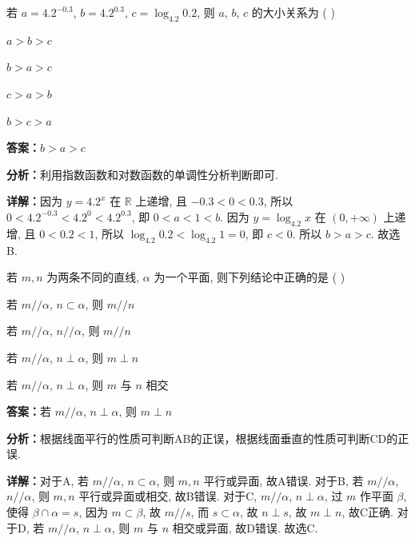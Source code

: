 \begin{question}[points=5]
若 $a = 4.2^{-0.3}$, $b = 4.2^{0.3}$, $c = \log_{4.2}{0.2}$, 则 $a$, $b$, $c$ 的大小关系为 ( )
\begin{choices}
  \item $a > b > c$
  \item $b > a > c$
  \item $c > a > b$
  \item $b > c > a$
\end{choices}
\begin{solution}
\textbf{答案：}$b > a > c$

\textbf{分析：}利用指数函数和对数函数的单调性分析判断即可.

\textbf{详解：}因为 $y=4.2^x$ 在 $\mathbb{R}$ 上递增, 且 $-0.3<0<0.3$, 所以 $0<4.2^{-0.3}<4.2^0<4.2^{0.3}$, 即 $0<a<1<b$. 因为 $y=\log_{4.2}x$ 在 $(0,+\infty)$ 上递增, 且 $0<0.2<1$, 所以 $\log_{4.2}{0.2}<\log_{4.2}{1}=0$, 即 $c<0$. 所以 $b>a>c$. 故选 B.
\end{solution}
\end{question}

\begin{question}[points=5]
若 $m,n$ 为两条不同的直线, $\alpha$ 为一个平面, 则下列结论中正确的是 ( )
\begin{choices}
  \item 若 $m // \alpha$, $n \subset \alpha$, 则 $m // n$
  \item 若 $m // \alpha$, $n // \alpha$, 则 $m // n$
  \item 若 $m // \alpha$, $n \perp \alpha$, 则 $m \perp n$
  \item 若 $m // \alpha$, $n \perp \alpha$, 则 $m$ 与 $n$ 相交
\end{choices}
\begin{solution}
\textbf{答案：}若 $m // \alpha$, $n \perp \alpha$, 则 $m \perp n$

\textbf{分析：}根据线面平行的性质可判断AB的正误，根据线面垂直的性质可判断CD的正误.

\textbf{详解：}对于A, 若 $m // \alpha$, $n \subset \alpha$, 则 $m,n$ 平行或异面, 故A错误. 对于B, 若 $m // \alpha$, $n // \alpha$, 则 $m,n$ 平行或异面或相交, 故B错误. 对于C, $m // \alpha$, $n \perp \alpha$, 过 $m$ 作平面 $\beta$, 使得 $\beta \cap \alpha = s$, 因为 $m \subset \beta$, 故 $m // s$, 而 $s \subset \alpha$, 故 $n \perp s$, 故 $m \perp n$, 故C正确. 对于D, 若 $m // \alpha$, $n \perp \alpha$, 则 $m$ 与 $n$ 相交或异面, 故D错误. 故选C.
\end{solution}
\end{question}

